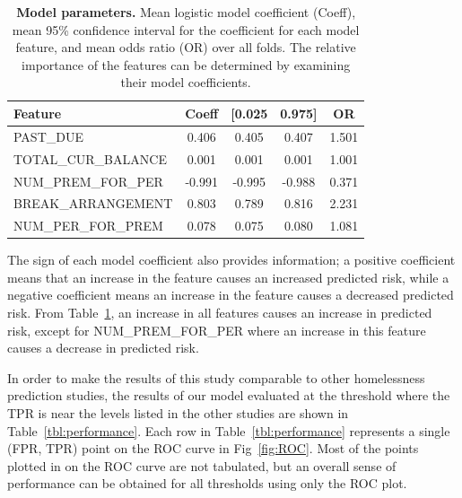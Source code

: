 \documentclass[10pt,letterpaper]{article}
\begin{document}
\begin{table}[!h]
    \centering
    \begin{tabular}{lcccc}
    \toprule
    Feature &                    Coeff &       [0.025 &       0.975] &  OR \\
    \midrule
             PAST\_DUE &         0.406 &        0.405 &        0.407 &    1.501 \\
    TOTAL\_CUR\_BALANCE &        0.001 &        0.001 &        0.001 &    1.001 \\
     NUM\_PREM\_FOR\_PER &      -0.991 &       -0.995 &       -0.988 &    0.371 \\
    BREAK\_ARRANGEMENT &         0.803 &        0.789 &        0.816 &    2.231 \\
     NUM\_PER\_FOR\_PREM &       0.078 &        0.075 &        0.080 &    1.081 \\
    \bottomrule
    \end{tabular}
    \caption{{\bf Model parameters.} Mean logistic model coefficient (Coeff), mean 95\% confidence interval for the coefficient for each model feature, and mean odds ratio (OR) over all folds. The relative importance of the features can be determined by examining their model coefficients.}
    \label{tbl:meanParams}
\end{table}

The sign of each model coefficient also provides information; a positive coefficient means that an increase in the feature causes an increased predicted risk, while a negative coefficient means an increase in the feature causes a decreased predicted risk. From Table~\ref{tbl:meanParams}, an increase in all features causes an increase in predicted risk, except for NUM\_PREM\_FOR\_PER where an increase in this feature causes a decrease in predicted risk.

In order to make the results of this study comparable to other homelessness prediction studies, the results of our model evaluated at the threshold where the TPR is near the levels listed in the other studies are shown in Table~\ref{tbl:performance}. Each row in Table~\ref{tbl:performance} represents a single (FPR, TPR) point on the ROC curve in Fig~\ref{fig:ROC}. Most of the points plotted in on the ROC curve are not tabulated, but an overall sense of performance can be obtained for all thresholds using only the ROC plot.
\end{document}
